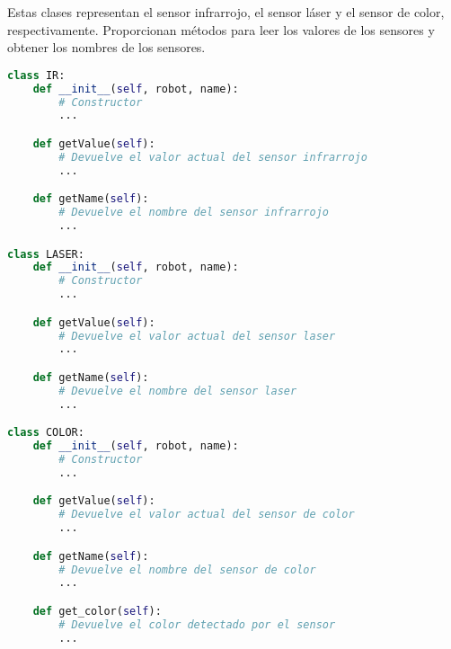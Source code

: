 \documentclass{article}
\begin{document}
Estas clases representan el sensor infrarrojo, el sensor láser y el sensor de color, respectivamente. Proporcionan métodos para leer los valores de los sensores y obtener los nombres de los sensores.

\begin{lstlisting}[language=Python, frame=single, backgroundcolor=\color{gray!10}]
class IR:
    def __init__(self, robot, name):
        # Constructor
        ...

    def getValue(self):
        # Devuelve el valor actual del sensor infrarrojo
        ...

    def getName(self):
        # Devuelve el nombre del sensor infrarrojo
        ...

class LASER:
    def __init__(self, robot, name):
        # Constructor
        ...

    def getValue(self):
        # Devuelve el valor actual del sensor laser
        ...

    def getName(self):
        # Devuelve el nombre del sensor laser
        ...

class COLOR:
    def __init__(self, robot, name):
        # Constructor
        ...

    def getValue(self):
        # Devuelve el valor actual del sensor de color
        ...

    def getName(self):
        # Devuelve el nombre del sensor de color
        ...

    def get_color(self):
        # Devuelve el color detectado por el sensor
        ...
\end{lstlisting}
\end{document}
